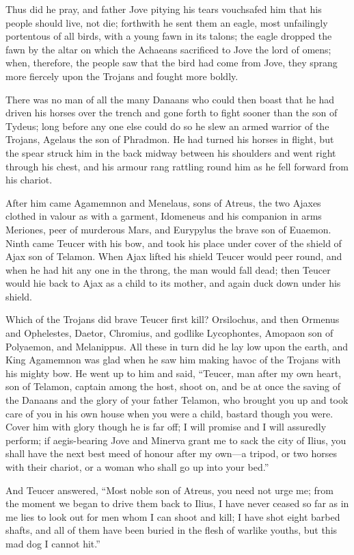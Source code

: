 Thus did he pray, and father Jove pitying his tears vouchsafed him that
his people should live, not die; forthwith he sent them an eagle, most
unfailingly portentous of all birds, with a young fawn in its talons; the
eagle dropped the fawn by the altar on which the Achaeans sacrificed to
Jove the lord of omens; when, therefore, the people saw that the bird had
come from Jove, they sprang more fiercely upon the Trojans and fought more
boldly.

There was no man of all the many Danaans who could then boast that he had
driven his horses over the trench and gone forth to fight sooner than the
son of Tydeus; long before any one else could do so he slew an armed
warrior of the Trojans, Agelaus the son of Phradmon. He had turned his
horses in flight, but the spear struck him in the back midway between his
shoulders and went right through his chest, and his armour rang rattling
round him as he fell forward from his chariot.

After him came Agamemnon and Menelaus, sons of Atreus, the two Ajaxes
clothed in valour as with a garment, Idomeneus and his companion in arms
Meriones, peer of murderous Mars, and Eurypylus the brave son of Euaemon.
Ninth came Teucer with his bow, and took his place under cover of the
shield of Ajax son of Telamon. When Ajax lifted his shield Teucer would
peer round, and when he had hit any one in the throng, the man would fall
dead; then Teucer would hie back to Ajax as a child to its mother, and
again duck down under his shield.

Which of the Trojans did brave Teucer first kill? Orsilochus, and then
Ormenus and Ophelestes, Daetor, Chromius, and godlike Lycophontes, Amopaon
son of Polyaemon, and Melanippus. All these in turn did he lay low upon
the earth, and King Agamemnon was glad when he saw him making havoc of the
Trojans with his mighty bow. He went up to him and said, “Teucer, man
after my own heart, son of Telamon, captain among the host, shoot on, and
be at once the saving of the Danaans and the glory of your father Telamon,
who brought you up and took care of you in his own house when you were a
child, bastard though you were. Cover him with glory though he is far off;
I will promise and I will assuredly perform; if aegis-bearing Jove and
Minerva grant me to sack the city of Ilius, you shall have the next best
meed of honour after my own—a tripod, or two horses with their
chariot, or a woman who shall go up into your bed.”

And Teucer answered, “Most noble son of Atreus, you need not urge me; from
the moment we began to drive them back to Ilius, I have never ceased so
far as in me lies to look out for men whom I can shoot and kill; I have
shot eight barbed shafts, and all of them have been buried in the flesh of
warlike youths, but this mad dog I cannot hit.”

